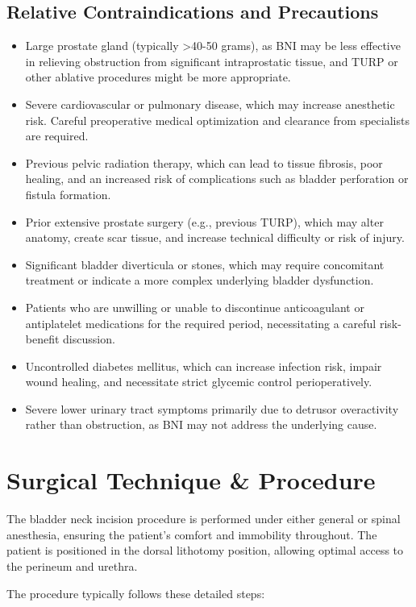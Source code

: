 \subsection*{Relative Contraindications and Precautions}
\begin{itemize}
  \item Large prostate gland (typically >40-50 grams), as BNI may be less effective in relieving obstruction from significant intraprostatic tissue, and TURP or other ablative procedures might be more appropriate.
  \item Severe cardiovascular or pulmonary disease, which may increase anesthetic risk. Careful preoperative medical optimization and clearance from specialists are required.
  \item Previous pelvic radiation therapy, which can lead to tissue fibrosis, poor healing, and an increased risk of complications such as bladder perforation or fistula formation.
  \item Prior extensive prostate surgery (e.g., previous TURP), which may alter anatomy, create scar tissue, and increase technical difficulty or risk of injury.
  \item Significant bladder diverticula or stones, which may require concomitant treatment or indicate a more complex underlying bladder dysfunction.
  \item Patients who are unwilling or unable to discontinue anticoagulant or antiplatelet medications for the required period, necessitating a careful risk-benefit discussion.
  \item Uncontrolled diabetes mellitus, which can increase infection risk, impair wound healing, and necessitate strict glycemic control perioperatively.
  \item Severe lower urinary tract symptoms primarily due to detrusor overactivity rather than obstruction, as BNI may not address the underlying cause.
\end{itemize}

\section*{Surgical Technique \& Procedure}
The bladder neck incision procedure is performed under either general or spinal anesthesia, ensuring the patient's comfort and immobility throughout. The patient is positioned in the dorsal lithotomy position, allowing optimal access to the perineum and urethra.

The procedure typically follows these detailed steps:

